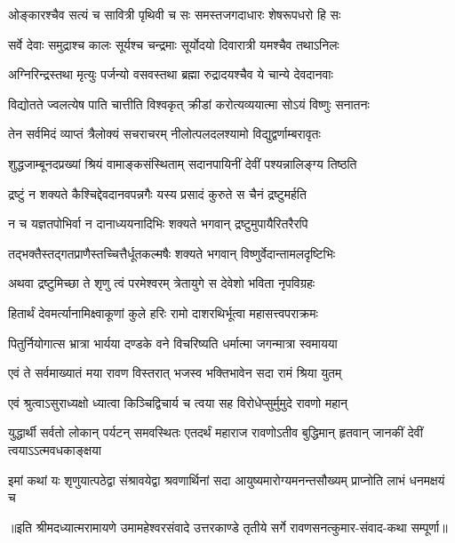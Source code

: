 \twolineshloka
{ओङ्कारश्चैव सत्यं च सावित्री पृथिवी च सः}
{समस्तजगदाधारः शेषरूपधरो हि सः} %

\twolineshloka
{सर्वे देवाः समुद्राश्च कालः सूर्यश्च चन्द्रमाः}
{सूर्योदयो दिवारात्री यमश्चैव तथाऽनिलः} %

\twolineshloka
{अग्निरिन्द्रस्तथा मृत्युः पर्जन्यो वसवस्तथा}
{ब्रह्मा रुद्रादयश्चैव ये चान्ये देवदानवाः} %

\twolineshloka
{विद्योतते ज्वलत्येष पाति चात्तीति विश्वकृत्}
{क्रीडां करोत्यव्ययात्मा सोऽयं विष्णुः सनातनः} %

\twolineshloka
{तेन सर्वमिदं व्याप्तं त्रैलोक्यं सचराचरम्}
{नीलोत्पलदलश्यामो विद्युद्वर्णाम्बरावृतः} %

\twolineshloka
{शुद्धजाम्बूनदप्रख्यां श्रियं वामाङ्कसंस्थिताम्}
{सदानपायिनीं देवीं पश्यन्नालिङ्ग्य तिष्ठति} %

\twolineshloka
{द्रष्टुं न शक्यते कैश्चिद्देवदानवपन्नगैः}
{यस्य प्रसादं कुरुते स चैनं द्रष्टुमर्हति} %

\twolineshloka
{न च यज्ञतपोभिर्वा न दानाध्ययनादिभिः}
{शक्यते भगवान् द्रष्टुमुपायैरितरैरपि} %

\twolineshloka
{तद्भक्तैस्तद्गतप्राणैस्तच्चित्तैर्धूतकल्मषैः}
{शक्यते भगवान् विष्णुर्वेदान्तामलदृष्टिभिः} %

\twolineshloka
{अथवा द्रष्टुमिच्छा ते शृणु त्वं परमेश्वरम्}
{त्रेतायुगे स देवेशो भविता नृपविग्रहः} %

\twolineshloka
{हितार्थं देवमर्त्यानामिक्ष्वाकूणां कुले हरिः}
{रामो दाशरथिर्भूत्वा महासत्त्वपराक्रमः} %

\twolineshloka
{पितुर्नियोगात्स भ्रात्रा भार्यया दण्डके वने}
{विचरिष्यति धर्मात्मा जगन्मात्रा स्वमायया} %

\twolineshloka
{एवं ते सर्वमाख्यातं मया रावण विस्तरात्}
{भजस्व भक्तिभावेन सदा रामं श्रिया युतम्} %


\twolineshloka
{एवं श्रुत्वाऽसुराध्यक्षो ध्यात्वा किञ्चिद्विचार्य च}
{त्वया सह विरोधेप्सुर्मुमुदे रावणो महान्} %

\threelineshloka
{युद्धार्थी सर्वतो लोकान् पर्यटन् समवस्थितः}
{एतदर्थं महाराज रावणोऽतीव बुद्धिमान्}
{हृतवान् जानकीं देवीं त्वयाऽऽत्मवधकाङ्क्षया} %

\fourlineindentedshloka
{इमां कथां यः शृणुयात्पठेद्वा}
{संश्रावयेद्वा श्रवणार्थिनां सदा}
{आयुष्यमारोग्यमनन्तसौख्यम्}
{प्राप्नोति लाभं धनमक्षयं च} %


{॥इति श्रीमदध्यात्मरामायणे उमामहेश्वरसंवादे उत्तरकाण्डे तृतीये  सर्गे
रावणसनत्कुमार-संवाद-कथा सम्पूर्णा॥}
